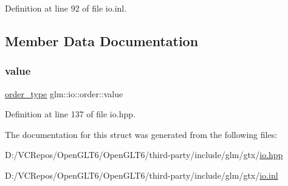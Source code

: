 Definition at line 92 of file io.\+inl.



\subsection{Member Data Documentation}
\mbox{\label{structglm_1_1io_1_1order_aa8788dd0568bacd081d02bd5aca9889b}} 
\subsubsection{\texorpdfstring{value}{value}}
{\footnotesize\ttfamily \mbox{\hyperlink{namespaceglm_1_1io_a3497781803fe594a37177e05ab2a795f}{order\+\_\+type}} glm\+::io\+::order\+::value}



Definition at line 137 of file io.\+hpp.



The documentation for this struct was generated from the following files\+:\begin{DoxyCompactItemize}
\item 
D\+:/\+V\+C\+Repos/\+Open\+G\+L\+T6/\+Open\+G\+L\+T6/third-\/party/include/glm/gtx/\mbox{\hyperlink{io_8hpp}{io.\+hpp}}\item 
D\+:/\+V\+C\+Repos/\+Open\+G\+L\+T6/\+Open\+G\+L\+T6/third-\/party/include/glm/gtx/\mbox{\hyperlink{io_8inl}{io.\+inl}}\end{DoxyCompactItemize}
